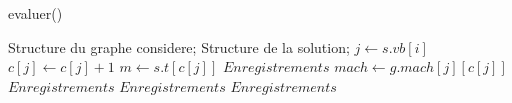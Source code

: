 \documentclass[11pt]{ctexart}
\begin{document}
\renewcommand{\thealgorithm}{} %
    \begin{algorithm}
        \caption{evaluer()} %
        \begin{algorithmic}[1] %
            \Require Structure du graphe considere;
                    Structure de la solution;
                \State $j \leftarrow s.vb[i]$
                \State $c[j] \leftarrow c[j] +1$
                    \State $m \leftarrow s.t[c[j]]$
                        \State $Enregistrements$
                    \EndIf
                \EndIf
                \State $mach \leftarrow g.mach[j][c[j]]$
                    \State $Enregistrements$
                        \State $Enregistrements$
                    \EndIf
                \EndIf
            \EndFor
                    \State $Enregistrements$
                \EndIf
            \EndFor
        \end{algorithmic}
    \end{algorithm}
\end{document}
